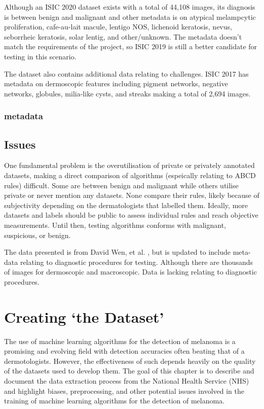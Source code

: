 
Although an ISIC 2020 dataset exists with a total of 44,108 images, its diagnosis is between benign and malignant and other metadata is on atypical melampcytic proliferation, cafe-au-lait macule, lentigo NOS, lichenoid keratosis, nevus, seborrheic keratosis, solar lentig, and other/unknown. The metadata doesn't match the requirements of the project, so ISIC 2019 is still a better candidate for testing in this scenario.

The dataset also contains additional data relating to challenges. ISIC 2017 has metadata on dermoscopic features including pigment networks, negative networks, globules, milia-like cysts, and streaks making a total of 2,694 images. 

\subsubsection{metadata}


\subsection{Issues}
One fundamental problem is the overutilisation of private or privately annotated datasets, making a direct comparison of algorithms (espeically relating to ABCD rules) difficult. Some are between benign and malignant\cite{Meskini2018, Kasmi2016, Ali2020b, Ali2020a} while others utilise private or never mention any datasets\cite{Kasmi2016, She2007, Tenenhaus2010, Ramezani2014, Zaqout2016}. None compare their rules, likely because of subjectivity depending on the dermatologists that labelled them. Ideally, more datasets and labels should be public to assess individual rules and reach objective measurements. Until then, testing algorithms conforms with malignant, suspicious, or benign.


The data presented is from David Wen, et al. \cite{Wen2022}, but is updated to include meta-data relating to diagnostic procedures for testing. Although there are thousands of images for dermoscopic and macroscopic. Data is lacking relating to diagnostic procedures.


\section{Creating `the Dataset'}
The use of machine learning algorithms for the detection of melanoma is a promising and evolving field with detection accuracies often beating that of a dermotologists\cite{Andre2017}. However, the effectiveness of such depends heavily on the quality of the datasets used to develop them\cite{Tae2019}. The goal of this chapter is to describe and document the data extraction process from the National Health Service (NHS) and highlight biases, preprocessing, and other potential issues involved in the training of machine learning algorithms for the detection of melanoma.

